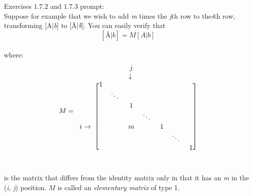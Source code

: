 \documentclass[12pt]{article}
\begin{document}
Exercises $1.7.2$  and $1.7.3$ prompt:\\

Suppose for example that we wish to add \textit{m} times the \textit{j}th row to the\textit{i}th row, transforming [A|\textit{b}] to [\^A|\textit{\^b}]. You can easily verify that
$$
[\text{\^A}|\textit{\^b}] = M[A|\textit{b}]
$$\\
where:\\

$$
M  
= 
\begin{blockarray} {cccccccc}
	& & & j\\	
	& & & \downarrow\\
	\begin{block} {c[ccccccc]}
			& 1\\
			& & \ddots\\
			& & & 1\\
			& & & & \ddots\\
			i\rightarrow& & & m & & 1\\
			& & & & & & \ddots\\
			& & & & & & &1\\
	\end{block}
\end{blockarray}
$$\\

is the matrix that differs from the identity matrix only in that it has an \textit{m} in the (\textit{i, j}) position. $M$ is called an \textit{elementary matrix} of type 1.
\end{document}
